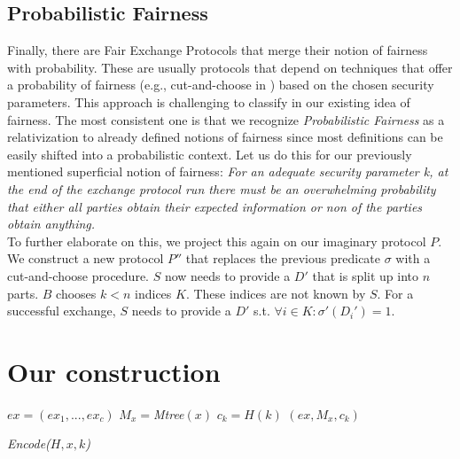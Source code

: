 \documentclass{cacthesis}
\newcounter{protocol}
\begin{document}
        \section{Probabilistic Fairness}
        Finally, there are Fair Exchange Protocols that merge their notion of fairness with probability. These are usually protocols that depend on techniques that offer a probability of fairness (e.g., cut-and-choose in \cite{DELGADOSEGURA2020832}) based on the chosen security parameters. This approach is challenging to classify in our existing idea of fairness. The most consistent one is that we recognize \textit{Probabilistic Fairness} as a relativization to already defined notions of fairness since most definitions can be easily shifted into a probabilistic context. Let us do this for our previously mentioned superficial notion of fairness: \textit{For an adequate security parameter k, at the end of the exchange protocol run there must be an overwhelming probability that either all parties obtain their expected information or non of the parties obtain anything.} \\
        To further elaborate on this, we project this again on our imaginary protocol $P$. We construct a new protocol $P''$ that replaces the previous predicate $\sigma$ with a cut-and-choose procedure. $S$ now needs to provide a $D'$ that is split up into $n$ parts. $B$ chooses $k < n$ indices $K$. These indices are not known by $S$. For a successful exchange, $S$ needs to provide a $D'$ s.t. $\forall i\in K:\sigma'\left( D_{i}'\right) =1$. \\

        
		
	\chapter{Our construction}

    \begin{algorithm}[H]
    \SetAlgoLined
      $ex = (ex_1,..., ex_c)$\;
      $M_x = $\textit{Mtree}$(x)$\;
      $c_k = H(k)$\;
     \Return $(ex, M_x, c_k)$\;

     \caption{\textit{Encode($H, x, k$)}}
    \end{algorithm}
    
\end{document}
